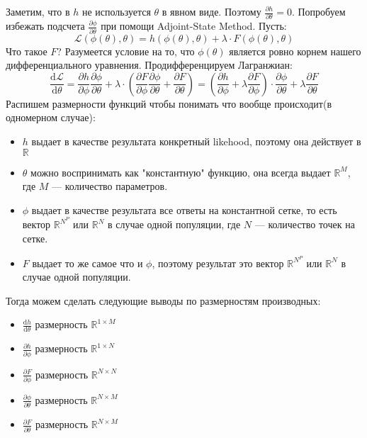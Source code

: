 \documentclass[10pt]{article}
\theoremstyle{plain}
\theoremstyle{remark}
\newcommand{\R}{\mathbb{R}}
\begin{document}
Заметим, что в $h$ не используется $\theta$ в явном виде. Поэтому $\frac{\partial h}{\partial \theta} = 0$. 
Попробуем избежать подсчета $\frac{\partial \phi}{\partial \theta}$ при помощи Adjoint-State Method. Пусть:
\begin{equation*}
  \mathcal{L}(\phi(\theta), \theta) = h(\phi(\theta), \theta) + \lambda \cdot F(\phi(\theta), \theta)
\end{equation*}
Что такое $F$? Разумеется условие на то, что $\phi(\theta)$ является ровно корнем нашего дифференциального уравнения.
Продифференцируем Лагранжиан:
\begin{equation*}
  \frac{\mathrm{d}\mathcal{L}}{\mathrm{d} \theta} = 
  \frac{\partial h}{\partial \phi} \frac{\partial \phi}{\partial \theta} +
  \lambda \cdot \left(\frac{\partial F}{\partial \phi} \frac{\partial \phi}{\partial \theta} + \frac{\partial F}{\partial \theta}\right) =
  \left(\frac{\partial h}{\partial \phi} + \lambda \frac{\partial F}{\partial \phi}\right) \cdot \frac{\partial \phi}{\partial \theta} + 
  \lambda \frac{\partial F}{\partial \theta}
\end{equation*}
Распишем размерности функций чтобы понимать что вообще происходит(в одномерном случае):
\begin{itemize}
  \item $h$ выдает в качестве результата конкретный likehood, поэтому она действует в $\R$
  \item $\theta$ можно воспринимать как "константную" функцию, она всегда выдает $\R^M$, где $M$ --- количество параметров.
  \item $\phi$ выдает в качестве результата все ответы на константной сетке, то есть вектор $\R^{N^P}$ или $\R^N$ в случае одной популяции, где $N$ --- количество точек на сетке.
  \item $F$ выдает то же самое что и $\phi$, поэтому результат это вектор $\R^{N^P}$ или $\R^N$ в случае одной популяции.
\end{itemize}
Тогда можем сделать следующие выводы по размерностям производных:
\begin{itemize}
  \item $\frac{\mathrm{d} h}{\mathrm{d} \theta}$ размерность $\R^{1 \times M}$
  \item $\frac{\partial h}{\partial \phi}$ размерность $\R^{1 \times N}$
  \item $\frac{\partial F}{\partial \phi}$ размерность $\R^{N \times N}$
  \item $\frac{\partial \phi}{\partial \theta}$ размерность $\R^{N \times M}$
  \item $\frac{\partial F}{\partial \theta}$ размерность $\R^{N \times M}$
\end{itemize}
\end{document}
